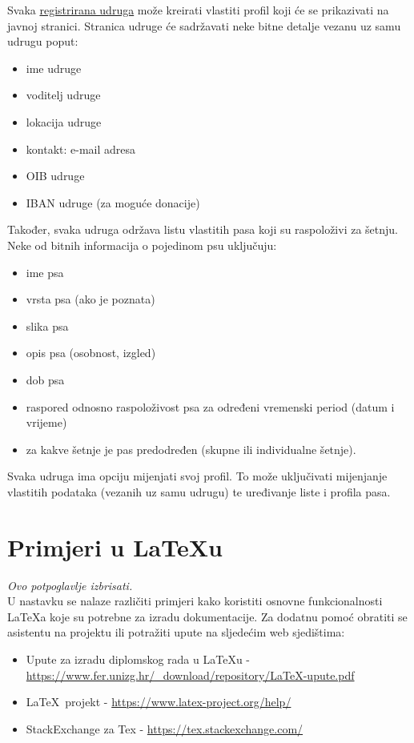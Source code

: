 	Svaka \underline{registrirana udruga} može kreirati vlastiti profil koji će se prikazivati na javnoj
	stranici. Stranica udruge će sadržavati neke bitne detalje vezanu uz samu udrugu poput: 
	\begin{itemize}
		\item ime udruge
		\item voditelj udruge
		\item lokacija udruge
		\item kontakt: e-mail adresa
		\item OIB udruge
		\item IBAN udruge (za moguće donacije)
	\end{itemize}
Također, svaka udruga održava listu vlastitih pasa koji su raspoloživi za šetnju. Neke od bitnih informacija o pojedinom psu uključuju: 
	\begin{itemize}
		\item ime psa
		\item vrsta psa (ako je poznata)
		\item slika psa 
		\item opis psa (osobnost, izgled)
		\item dob psa
		\item raspored odnosno raspoloživost psa za određeni vremenski period (datum i vrijeme) 
		\item za kakve šetnje je pas predodređen (skupne ili individualne šetnje). 
	\end{itemize}
Svaka udruga ima opciju mijenjati svoj profil. To može uključivati mijenjanje vlastitih podataka (vezanih uz samu udrugu) te uređivanje liste i profila pasa. 





\vspace{15pt}
	  \vspace{20pt}

		\iffalse
		\section{Primjeri u \LaTeX u}
		
		\textit{Ovo potpoglavlje izbrisati.}\\

		U nastavku se nalaze različiti primjeri kako koristiti osnovne funkcionalnosti \LaTeX a koje su potrebne za izradu dokumentacije. Za dodatnu pomoć obratiti se asistentu na projektu ili potražiti upute na sljedećim web sjedištima:
		\begin{itemize}
			\item Upute za izradu diplomskog rada u \LaTeX u - \url{https://www.fer.unizg.hr/_download/repository/LaTeX-upute.pdf}
			\item \LaTeX\ projekt - \url{https://www.latex-project.org/help/}
			\item StackExchange za Tex - \url{https://tex.stackexchange.com/}\\
		
		\end{itemize} 	


